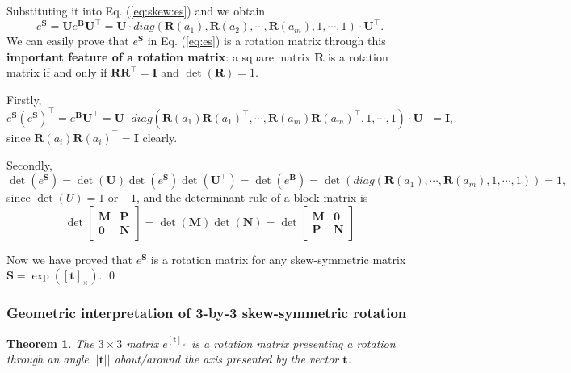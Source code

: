 \documentclass[12pt]{article}
\newtheorem{theorem}{Theorem}[section]
\numberwithin{equation}{section}
\renewenvironment{proof}{{\bfseries Proof.}}{\qed \\}
\begin{document}
\begin{proof}
Substituting it into Eq. (\ref{eq:skew:es}) and we obtain
\begin{equation}
e^{\mathbf{S}}=\mathbf{U}e^{\mathbf{B}}\mathbf{U}^\top=\mathbf{U}\cdot diag(\mathbf{R}(a_1), \mathbf{R}(a_2), \cdots, \mathbf{R}(a_m), 1, \cdots, 1) \cdot \mathbf{U}^\top.
\label{eq:es}
\end{equation}
We can easily prove that $e^{\mathbf{S}}$ in Eq. (\ref{eq:es}) is a rotation matrix through this \textbf{important feature of a rotation matrix}: a square matrix $\mathbf{R}$ is a rotation matrix if and only if $\mathbf{R}\mathbf{R}^\top = \mathbf{I}$ and $\det(\mathbf{R}) = 1$.

Firstly,
\begin{equation*}
e^{\mathbf{S}}(e^{\mathbf{S}})^\top = e^{\mathbf{B}}\mathbf{U}^\top=\mathbf{U} \cdot diag(\mathbf{R}(a_1)\mathbf{R}(a_1)^\top, \cdots, \mathbf{R}(a_m)\mathbf{R}(a_m)^\top, 1, \cdots, 1) \cdot \mathbf{U}^\top = \mathbf{I},
\end{equation*}
since $\mathbf{R}(a_i)\mathbf{R}(a_i)^\top = \mathbf{I}$ clearly.

Secondly,
\begin{equation*}
\det(e^{\mathbf{S}}) = \det(\mathbf{U}) \det(e^{\mathbf{S}}) \det(\mathbf{U}^\top) = \det(e^{\mathbf{B}}) = \det(diag(\mathbf{R}(a_1), \cdots, \mathbf{R}(a_m), 1, \cdots, 1)) = 1,
\end{equation*}
since $\det(U) = 1$ or $-1$, and the determinant rule of a block matrix is
\begin{equation*}
\det
\begin{bmatrix}
\mathbf{M} & \mathbf{P} \\
\mathbf{0} & \mathbf{N}
\end{bmatrix}
= \det(\mathbf{M}) \det(\mathbf{N})
= \det
\begin{bmatrix}
\mathbf{M} & \mathbf{0} \\
\mathbf{P} & \mathbf{N}
\end{bmatrix}
\end{equation*}

Now we have proved that $ e^{\mathbf{S}}$ is a rotation matrix for any skew-symmetric matrix $\mathbf{S} = \exp([\mathbf{t}]_{\times})$.
\end{proof}

\subsubsection{Geometric interpretation of 3-by-3 skew-symmetric rotation}
\begin{theorem}
The $3 \times 3$ matrix $e^{[\mathbf{t}]_{\times}}$ is a rotation matrix  presenting a rotation through an angle $||\mathbf{t}||$ about/around the axis presented by the vector $\mathbf{t}$.
\label{thm:skew:rot}
\end{theorem}
\end{document}
